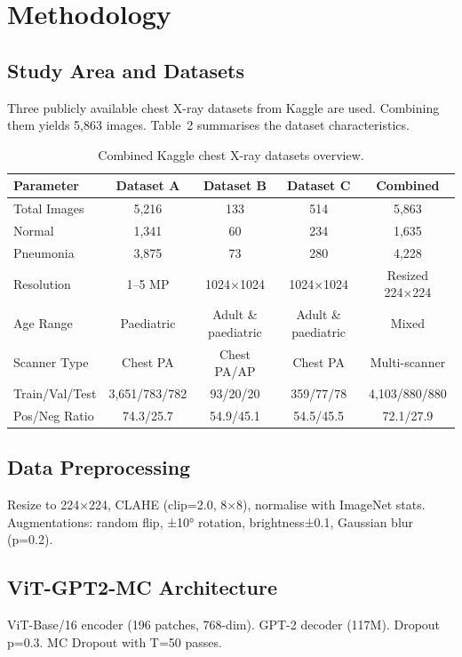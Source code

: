 \documentclass{jcst}
\begin{document}
\section{Methodology}
\subsection{Study Area and Datasets}
Three publicly available chest X-ray datasets from Kaggle are used. Combining them yields 5,863 images. Table~2 summarises the dataset characteristics.

\begin{table}[htbp]
\centering
\small
\caption{Combined Kaggle chest X-ray datasets overview.}
\label{tab:datasets}
\begin{tabular}{lcccc}
\toprule
\textbf{Parameter} & \textbf{Dataset A} & \textbf{Dataset B} & \textbf{Dataset C} & \textbf{Combined} \\
\midrule
Total Images & 5,216 & 133 & 514 & 5,863 \\
Normal & 1,341 & 60 & 234 & 1,635 \\
Pneumonia & 3,875 & 73 & 280 & 4,228 \\
Resolution & 1–5 MP & 1024×1024 & 1024×1024 & Resized 224×224 \\
Age Range & Paediatric & Adult \& paediatric & Adult \& paediatric & Mixed \\
Scanner Type & Chest PA & Chest PA/AP & Chest PA & Multi-scanner \\
Train/Val/Test & 3,651/783/782 & 93/20/20 & 359/77/78 & 4,103/880/880 \\
Pos/Neg Ratio & 74.3/25.7 & 54.9/45.1 & 54.5/45.5 & 72.1/27.9 \\
\bottomrule
\end{tabular}
\end{table}

\subsection{Data Preprocessing}
Resize to 224×224, CLAHE (clip=2.0, 8×8), normalise with ImageNet stats. Augmentations: random flip, ±10° rotation, brightness±0.1, Gaussian blur (p=0.2).

\subsection{ViT-GPT2-MC Architecture}
ViT-Base/16 encoder (196 patches, 768-dim). GPT-2 decoder (117M). Dropout p=0.3. MC Dropout with T=50 passes.
\end{document}
